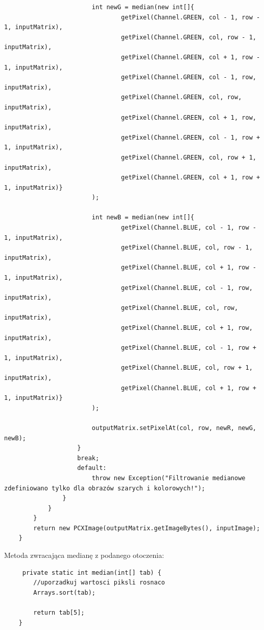 \documentclass{article}
\begin{document}
\begin{verbatim}
                        int newG = median(new int[]{
                                getPixel(Channel.GREEN, col - 1, row - 1, inputMatrix),
                                getPixel(Channel.GREEN, col, row - 1, inputMatrix),
                                getPixel(Channel.GREEN, col + 1, row - 1, inputMatrix),
                                getPixel(Channel.GREEN, col - 1, row, inputMatrix),
                                getPixel(Channel.GREEN, col, row, inputMatrix),
                                getPixel(Channel.GREEN, col + 1, row, inputMatrix),
                                getPixel(Channel.GREEN, col - 1, row + 1, inputMatrix),
                                getPixel(Channel.GREEN, col, row + 1, inputMatrix),
                                getPixel(Channel.GREEN, col + 1, row + 1, inputMatrix)}
                        );
                        
                        int newB = median(new int[]{
                                getPixel(Channel.BLUE, col - 1, row - 1, inputMatrix),
                                getPixel(Channel.BLUE, col, row - 1, inputMatrix),
                                getPixel(Channel.BLUE, col + 1, row - 1, inputMatrix),
                                getPixel(Channel.BLUE, col - 1, row, inputMatrix),
                                getPixel(Channel.BLUE, col, row, inputMatrix),
                                getPixel(Channel.BLUE, col + 1, row, inputMatrix),
                                getPixel(Channel.BLUE, col - 1, row + 1, inputMatrix),
                                getPixel(Channel.BLUE, col, row + 1, inputMatrix),
                                getPixel(Channel.BLUE, col + 1, row + 1, inputMatrix)}
                        );
                        
                        outputMatrix.setPixelAt(col, row, newR, newG, newB);
                    }
                    break;
                    default:
                        throw new Exception("Filtrowanie medianowe zdefiniowano tylko dla obrazów szarych i kolorowych!");
                }
            }
        }
        return new PCXImage(outputMatrix.getImageBytes(), inputImage);
    }
	\end{verbatim}
	Metoda zwracająca medianę z podanego otoczenia:
	\begin{verbatim}
	 private static int median(int[] tab) {
        //uporzadkuj wartosci piksli rosnaco
        Arrays.sort(tab);
        
        return tab[5];
    }
	\end{verbatim}
		
\end{document}
